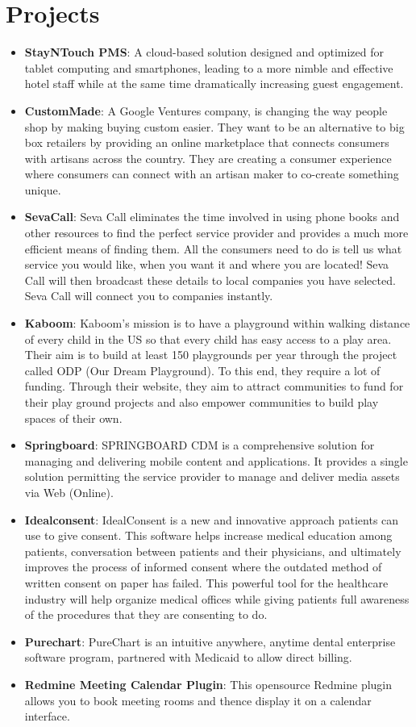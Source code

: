 \documentclass[letterpaper,11pt]{article}
\newcommand{\resumeItem}[2]{
  \item\small{
    \textbf{#1}{: #2 \vspace{-2pt}}
  }
}
\newcommand{\resumeSubItem}[2]{\resumeItem{#1}{#2}\vspace{-4pt}}
\newcommand{\resumeSubHeadingListStart}{\begin{itemize}[leftmargin=*]}
\newcommand{\resumeSubHeadingListEnd}{\end{itemize}}
\begin{document}
\section{Projects}
\resumeSubHeadingListStart
\resumeSubItem{StayNTouch PMS}
{A cloud-based solution designed and optimized for tablet computing and smartphones,
leading to a more nimble and effective hotel staff while at the same time dramatically increasing guest
engagement.}
\resumeSubItem{CustomMade}
{A Google Ventures company, is changing the way people shop by making
buying custom easier. They want to be an alternative to big box retailers by providing an online
marketplace that connects consumers with artisans across the country. They are creating a consumer
experience where consumers can connect with an artisan maker to co-create something unique.}
\resumeSubItem{SevaCall}
{Seva Call eliminates the time involved in using phone books and other resources to find the
perfect service provider and provides a much more efficient means of finding them. All the consumers
need to do is tell us what service you would like, when you want it and where you are located! Seva Call will then broadcast these details to local companies you have selected. Seva Call will connect you to companies instantly.}
\resumeSubItem{Kaboom}
{Kaboom's mission is to have a playground within walking distance of every child in the US
so that every child has easy access to a play area. Their aim is to build at least 150 playgrounds per year through the project called ODP (Our Dream Playground). To this end, they require a lot of funding. Through their website, they aim to attract communities to fund for their play ground projects and also empower communities to build play spaces of their own.}
\resumeSubItem{Springboard}
{SPRINGBOARD CDM is a comprehensive solution for managing and delivering mobile
content and applications. It provides a single solution permitting the service provider to manage and
deliver media assets via Web (Online).}
\resumeSubItem{Idealconsent}
{IdealConsent is a new and innovative approach patients can use to give consent. This
software helps increase medical education among patients, conversation between patients and their
physicians, and ultimately improves the process of informed consent where the outdated method of
written consent on paper has failed. This powerful tool for the healthcare industry will help organize
medical offices while giving patients full awareness of the procedures that they are consenting to do.}
\resumeSubItem{Purechart}
{PureChart is an intuitive anywhere, anytime dental enterprise software program, partnered with Medicaid to allow direct billing. }
\resumeSubItem{Redmine Meeting Calendar Plugin}
{This opensource Redmine plugin allows you to book meeting rooms and thence display it on a calendar interface.}
\resumeSubHeadingListEnd
\end{document}
